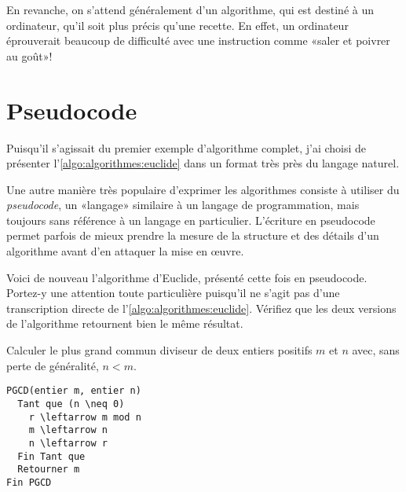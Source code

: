 En revanche, on s'attend généralement d'un algorithme, qui est destiné
à un ordinateur, qu'il soit plus précis qu'une recette. En effet, un
ordinateur éprouverait beaucoup de difficulté avec une instruction
comme «saler et poivrer au goût»!



\section{Pseudocode}
\label{sec:algorithmes:pseudocode}

Puisqu'il s'agissait du premier exemple d'algorithme complet, j'ai
choisi de présenter l'\autoref{algo:algorithmes:euclide} dans un
format très près du langage naturel.

Une autre manière très populaire d'exprimer les algorithmes consiste à
utiliser du \emph{pseudocode}, un «langage»
similaire à un langage de programmation, mais toujours sans référence
à un langage en particulier. L'écriture en pseudocode permet parfois
de mieux prendre la mesure de la structure et des détails d'un
algorithme avant d'en attaquer la mise en œuvre.

Voici de nouveau l'algorithme
d'Euclide, présenté cette fois en pseudocode. Portez-y une attention
toute particulière puisqu'il ne s'agit pas d'une transcription directe
de l'\autoref{algo:algorithmes:euclide}. Vérifiez que les deux
versions de l'algorithme retournent bien le même résultat.

\begin{algorithme}
  \label{algo:algorithmes:euclide:pseudo}
  Calculer le plus grand commun diviseur de deux entiers positifs $m$
  et $n$ avec, sans perte de généralité, $n < m$.
\begin{Schunk}
\begin{Verbatim}[commandchars=\\\{\}]
PGCD(entier m, entier n)
  Tant que (n \neq 0)
    r \leftarrow m mod n
    m \leftarrow n
    n \leftarrow r
  Fin Tant que
  Retourner m
Fin PGCD
\end{Verbatim}
\end{Schunk}
\end{algorithme}

